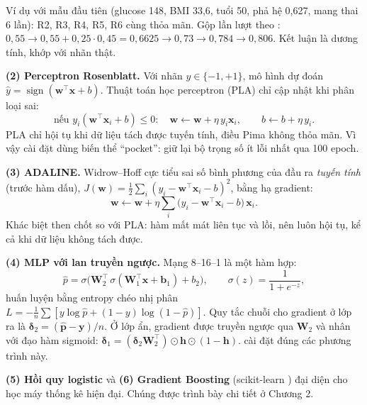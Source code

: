 Ví dụ với mẫu đầu tiên (glucose 148, BMI 33,6, tuổi 50, phả hệ 0,627, mang thai 6 lần): R2, R3, R4, R5, R6 cùng thỏa mãn. Gộp lần lượt theo : $0{,}55 \to 0{,}55 + 0{,}25 \cdot 0{,}45 = 0{,}6625 \to 0{,}73 \to 0{,}784 \to 0{,}806$. Kết luận là dương tính, khớp với nhãn thật.

\textbf{(2) Perceptron Rosenblatt.} Với nhãn $y\in\{-1,+1\}$, mô hình dự đoán $\hat y = \operatorname{sign}(\mathbf w^\top \mathbf x + b)$. Thuật toán học perceptron (PLA) chỉ cập nhật khi phân loại sai:
\begin{equation}
\text{nếu } y_i(\mathbf w^\top\mathbf x_i + b) \le 0: \quad \mathbf w \leftarrow \mathbf w + \eta\, y_i \mathbf x_i,\qquad b \leftarrow b + \eta\, y_i .
\label{eq:pla}
\end{equation}
PLA chỉ hội tụ khi dữ liệu tách được tuyến tính, điều Pima không thỏa mãn. Vì vậy cài đặt dùng biến thể ``pocket'': giữ lại bộ trọng số ít lỗi nhất qua 100 epoch.

\textbf{(3) ADALINE.} Widrow–Hoff cực tiểu sai số bình phương của đầu ra \emph{tuyến tính} (trước hàm dấu), $J(\mathbf w) = \tfrac12\sum_i (y_i - \mathbf w^\top\mathbf x_i - b)^2$, bằng hạ gradient:
\begin{equation}
\mathbf w \leftarrow \mathbf w + \eta \sum_i \big(y_i - \mathbf w^\top\mathbf x_i - b\big)\,\mathbf x_i .
\label{eq:adaline}
\end{equation}
Khác biệt then chốt so với PLA: hàm mất mát liên tục và lồi, nên luôn hội tụ, kể cả khi dữ liệu không tách được.

\textbf{(4) MLP với lan truyền ngược.} Mạng 8–16–1 là một hàm hợp:
\begin{equation}
\hat p = \sigma\!\big(\mathbf W_2^\top\, \sigma(\mathbf W_1^\top \mathbf x + \mathbf b_1) + b_2\big), \qquad \sigma(z) = \frac{1}{1+e^{-z}},
\label{eq:mlp1}
\end{equation}
huấn luyện bằng entropy chéo nhị phân $L=-\frac1n\sum[y\log\hat p+(1-y)\log(1-\hat p)]$. Quy tắc chuỗi cho gradient ở lớp ra là $\boldsymbol\delta_2 = (\hat{\mathbf p} - \mathbf y)/n$. Ở lớp ẩn, gradient được truyền ngược qua $\mathbf W_2$ và nhân với đạo hàm sigmoid: $\boldsymbol\delta_1 = (\boldsymbol\delta_2 \mathbf W_2^\top)\odot \mathbf h \odot (1-\mathbf h)$.  cài đặt đúng các phương trình này.

\textbf{(5) Hồi quy logistic} và \textbf{(6) Gradient Boosting} (scikit-learn \cite{pedregosa2011}) đại diện cho học máy thống kê hiện đại. Chúng được trình bày chi tiết ở Chương 2.

